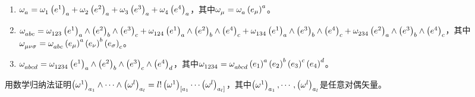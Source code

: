 \begin{xiti}
	\begin{jie}
		\begin{enumerate}
			\item $ \tensor{\omega}{_a} = \tensor{\omega}{_1} \tensor{\left(e^1\right)}{_a} + \tensor{\omega}{_2} \tensor{\left(e^2\right)}{_a} + \tensor{\omega}{_3} \tensor{\left(e^3\right)}{_a} + \tensor{\omega}{_4} \tensor{\left(e^4\right)}{_a} $，其中$\tensor{\omega}{_\mu}= \tensor{\omega}{_a} \tensor{\left(e_\mu\right)}{^a} $。
			\item $\tensor{\omega}{_a_b_c} = \tensor{\omega}{_{123}} \tensor{\left(e^1\right)}{_a} \wedge \tensor{\left(e^2\right)}{_b} \wedge \tensor{\left(e^3\right)}{_c} + \tensor{\omega}{_{124}} \tensor{\left(e^1\right)}{_a} \wedge \tensor{\left(e^2\right)}{_b} \wedge \tensor{\left(e^4\right)}{_c} + \tensor{\omega}{_{134}} \tensor{\left(e^1\right)}{_a} \wedge \tensor{\left(e^3\right)}{_b} \wedge \tensor{\left(e^4\right)}{_c} + \tensor{\omega}{_{234}} \tensor{\left(e^2\right)}{_a} \wedge \tensor{\left(e^3\right)}{_b} \wedge \tensor{\left(e^4\right)}{_c} $，其中$\tensor{\omega}{_{\mu\nu\sigma}} = \tensor{\omega}{_{abc}} \tensor{\left(e_\mu\right)}{^a} \tensor{\left(e_\nu\right)}{^b} \tensor{\left(e_\sigma\right)}{_c} $。
			\item $\tensor{\omega}{_{abcd}} = \tensor{\omega}{_{1234}} \tensor{\left(e^1\right)}{_a} \wedge \tensor{\left(e^2\right)}{_b} \wedge \tensor{\left(e^3\right)}{_c} \wedge \tensor{\left(e^4\right)}{_d} $，其中$\tensor{\omega}{_{1234}}= \tensor{\omega}{_{abcd}} \tensor{\left(e_1\right)}{^a} \tensor{\left(e_2\right)}{^b} \tensor{\left(e_3\right)}{^c} \tensor{\left(e_4\right)}{^d} $。
		\end{enumerate}
	\end{jie}

	\item 用数学归纳法证明$ \tensor{\left( \omega^1 \right)}{_{a_1}} \wedge \cdots \wedge \tensor{\left( \omega^l \right)}{_{a_l}} = l! \tensor{\left( \omega^1 \right)}{_{[a_1}} \cdots \tensor{\left( \omega^l \right)}{_{a_l]}} $，其中$ \tensor{\left( \omega^1 \right)}{_{a_1}}, \cdots , \tensor{\left( \omega^l \right)}{_{a_l}} $是任意对偶矢量。


\end{xiti}
